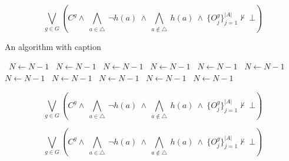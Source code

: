 \documentclass[a4paper]{article}
\begin{document}
\[\bigvee_{g\in G} (C^g \wedge\ \bigwedge_{a\in \triangle}\ \neg h(a)\ \wedge\ \bigwedge_{a\notin \triangle}\ h(a)\ \wedge\ \{O_j^g\}_{j=1}^{|A|} \nvdash\ \bot )\]

\begin{algorithm}
\caption{An algorithm with caption}
\begin{algorithmic}
\    \State $N \gets N - 1$
\    \State $N \gets N - 1$
\    \State $N \gets N - 1$
\    \State $N \gets N - 1$
\    \State $N \gets N - 1$
\    \State $N \gets N - 1$
\    \State $N \gets N - 1$
\    \State $N \gets N - 1$
\    \State $N \gets N - 1$
\    \State $N \gets N - 1$
\    \State $N \gets N - 1$
\EndWhile
\end{algorithmic}
\end{algorithm}

\[\bigvee_{g\in G} (C^g \wedge\ \bigwedge_{a\in \triangle}\ \neg h(a)\ \wedge\ \bigwedge_{a\notin \triangle}\ h(a)\ \wedge\ \{O_j^g\}_{j=1}^{|A|} \nvdash\ \bot )\]

\[\bigvee_{g\in G} (C^g \wedge\ \bigwedge_{a\in \triangle}\ \neg h(a)\ \wedge\ \bigwedge_{a\notin \triangle}\ h(a)\ \wedge\ \{O_j^g\}_{j=1}^{|A|} \nvdash\ \bot )\]
\end{document}
